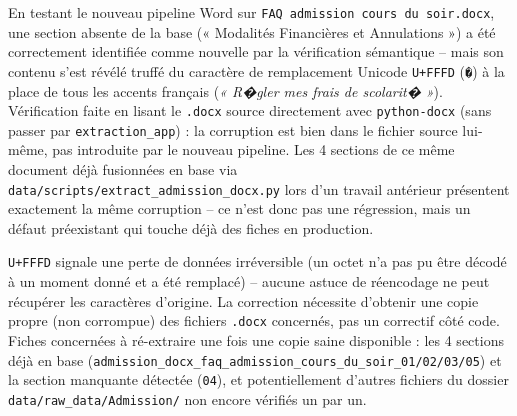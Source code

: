 \documentclass[11pt,a4paper]{report}
\begin{document}
En testant le nouveau pipeline Word sur \texttt{FAQ admission cours du soir.docx}, une
section absente de la base (« Modalités Financières et Annulations ») a été correctement
identifiée comme nouvelle par la vérification sémantique -- mais son contenu s'est révélé
truffé du caractère de remplacement Unicode \texttt{U+FFFD} (\texttt{�}) à la place de
tous les accents français (\textit{« R�gler mes frais de scolarit� »}). Vérification
faite en lisant le \texttt{.docx} source directement avec \texttt{python-docx} (sans
passer par \texttt{extraction\_app}) : la corruption est bien dans le fichier source
lui-même, pas introduite par le nouveau pipeline. Les 4 sections de ce même document déjà
fusionnées en base via \texttt{data/scripts/extract\_admission\_docx.py} lors d'un travail
antérieur présentent exactement la même corruption -- ce n'est donc pas une régression,
mais un défaut préexistant qui touche déjà des fiches en production.
\begin{statutlimite}
\texttt{U+FFFD} signale une perte de données irréversible (un octet n'a pas pu être
décodé à un moment donné et a été remplacé) -- aucune astuce de réencodage ne peut
récupérer les caractères d'origine. La correction nécessite d'obtenir une copie propre
(non corrompue) des fichiers \texttt{.docx} concernés, pas un correctif côté code. Fiches
concernées à ré-extraire une fois une copie saine disponible : les 4 sections déjà en
base (\texttt{admission\_docx\_faq\_admission\_cours\_du\_soir\_01/02/03/05}) et la
section manquante détectée (\texttt{04}), et potentiellement d'autres fichiers du dossier
\texttt{data/raw\_data/Admission/} non encore vérifiés un par un.
\end{statutlimite}
\end{document}
